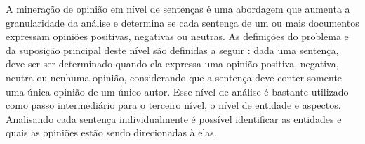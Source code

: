 \documentclass[template.tex]{subfiles}
\begin{document}

A mineração de opinião em nível de sentenças é uma abordagem que aumenta a granularidade da análise e determina se cada sentença de um ou mais documentos expressam opiniões positivas, negativas ou neutras. As definições do problema e da suposição principal deste nível são definidas a seguir \cite{bing:2012}: dada uma sentença, deve ser ser determinado quando ela expressa uma opinião positiva, negativa, neutra ou nenhuma opinião, considerando que a sentença deve conter somente uma única opinião de um único autor. Esse nível de análise é bastante utilizado como passo intermediário para o terceiro nível, o nível de entidade e aspectos. Analisando cada sentença individualmente é possível identificar as entidades e quais as opiniões estão sendo direcionadas à elas. 

\end{document}
